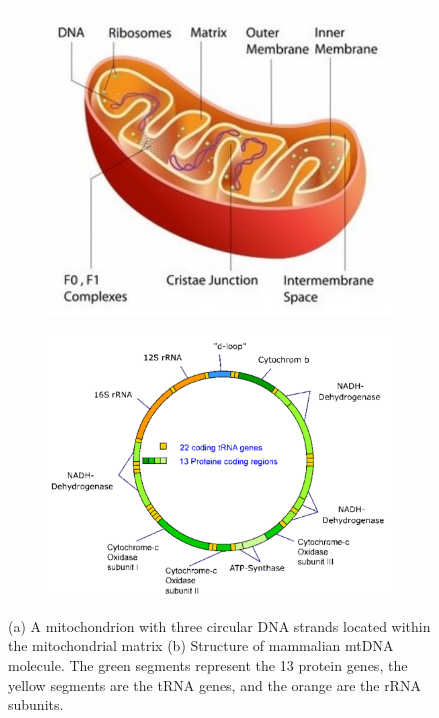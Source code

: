 \documentclass[11pt, oneside]{article}
\begin{document}
\begin{figure}[htb]
\centering
  \begin{subfigure}[b]{.5\linewidth}
    \centering
    \includegraphics[width=.99\textwidth]{images/mito.pdf}
    \caption{}\label{fig:mtDNA1}
  \end{subfigure}%
  \begin{subfigure}[b]{.5\linewidth}
    \centering
    \includegraphics[width=.99\textwidth]{images/mtDNA.pdf}
    \caption{}\label{fig:mtDNA2}
  \end{subfigure}%
  \caption{(a) A mitochondrion with three circular DNA strands located within the mitochondrial matrix
  (b) Structure of mammalian mtDNA molecule. The green segments represent the 13 protein genes,
the yellow segments are the tRNA genes, and the orange are the rRNA subunits.}\label{fig:mtDNA}
\end{figure}
\end{document}
